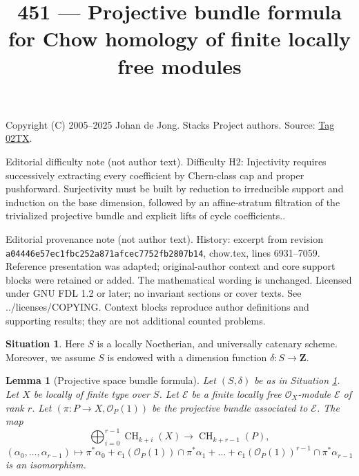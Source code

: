 \documentclass{amsart}
\theoremstyle{plain}
\newtheorem{lemma}[subsection]{Lemma}
\theoremstyle{definition}
\newtheorem{situation}[subsection]{Situation}
\theoremstyle{remark}
\numberwithin{equation}{subsection}
\def\CH{\mathop{\mathrm{CH}}\nolimits}
\begin{document}
\title[Stacks Project, Tag 02TX]{451 --- Projective bundle formula for Chow homology of finite locally free modules}
\maketitle
\noindent Copyright (C) 2005--2025 Johan de Jong. Stacks Project authors. Source: \href{https://stacks.math.columbia.edu/tag/02TX}{Tag 02TX}.

\noindent Editorial difficulty note (not author text). Difficulty H2: Injectivity requires successively extracting every coefficient by Chern-class cap and proper pushforward. Surjectivity must be built by reduction to irreducible support and induction on the base dimension, followed by an affine-stratum filtration of the trivialized projective bundle and explicit lifts of cycle coefficients..

\noindent Editorial provenance note (not author text). History: excerpt from revision \texttt{a0444\allowbreak 6e57e\allowbreak c1fbc\allowbreak 252a8\allowbreak 71afc\allowbreak ec775\allowbreak 2fb28\allowbreak 07b14}, chow.tex, lines 6931--7059. Reference presentation was adapted; original-author context and core support blocks were retained or added. The mathematical wording is unchanged. Licensed under GNU FDL 1.2 or later; no invariant sections or cover texts. See ../licenses/COPYING. Context blocks reproduce author definitions and supporting results; they are not additional counted problems.

\begin{situation}
\label{situation-setup}
Here $S$ is a locally Noetherian, and universally catenary scheme.
Moreover, we assume $S$ is endowed with a dimension function
$\delta : S \longrightarrow \mathbf{Z}$.
\end{situation}

\begin{lemma}[Projective space bundle formula]
\label{lemma-chow-ring-projective-bundle}
Let $(S, \delta)$ be as in Situation \ref{situation-setup}.
Let $X$ be locally of finite type over $S$.
Let $\mathcal{E}$ be a finite locally free $\mathcal{O}_X$-module
$\mathcal{E}$ of rank $r$. Let $(\pi : P \to X, \mathcal{O}_P(1))$
be the projective bundle associated to $\mathcal{E}$.
The map
$$
\bigoplus\nolimits_{i = 0}^{r - 1}
\CH_{k + i}(X)
\longrightarrow
\CH_{k + r - 1}(P),
$$
$$
(\alpha_0, \ldots, \alpha_{r-1})
\longmapsto
\pi^*\alpha_0 +
c_1(\mathcal{O}_P(1)) \cap \pi^*\alpha_1
+ \ldots +
c_1(\mathcal{O}_P(1))^{r - 1} \cap \pi^*\alpha_{r-1}
$$
is an isomorphism.
\end{lemma}
\end{document}
